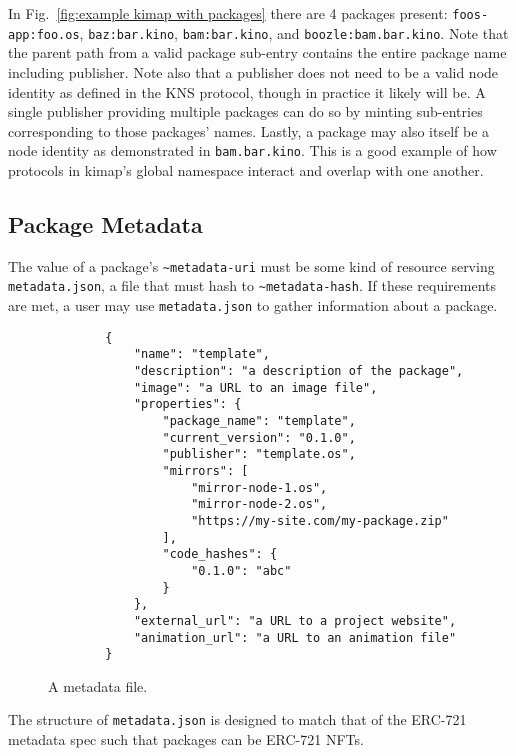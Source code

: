 \documentclass[runningheads]{llncs}
\begin{document}
In Fig.~\ref{fig:example kimap with packages} there are 4 packages present: \verb|foos-app:foo.os|, \verb|baz:bar.kino|, \verb|bam:bar.kino|, and \verb|boozle:bam.bar.kino|.
Note that the parent path from a valid package sub-entry contains the entire package name including publisher.
Note also that a publisher does not need to be a valid node identity as defined in the KNS protocol, though in practice it likely will be.
A single publisher providing multiple packages can do so by minting sub-entries corresponding to those packages' names.
Lastly, a package may also itself be a node identity as demonstrated in \verb|bam.bar.kino|.
This is a good example of how protocols in kimap's global namespace interact and overlap with one another.

\subsection{Package Metadata}
\label{sec:packagemanagermetadata}

The value of a package's \verb|~metadata-uri| must be some kind of resource serving \verb|metadata.json|, a file that must hash to \verb|~metadata-hash|.
If these requirements are met, a user may use \verb|metadata.json| to gather information about a package.

\begin{figure}[H]
    \centering
    \begin{verbatim}
        {
            "name": "template",
            "description": "a description of the package",
            "image": "a URL to an image file",
            "properties": {
                "package_name": "template",
                "current_version": "0.1.0",
                "publisher": "template.os",
                "mirrors": [
                    "mirror-node-1.os",
                    "mirror-node-2.os",
                    "https://my-site.com/my-package.zip"
                ],
                "code_hashes": {
                    "0.1.0": "abc"
                }
            },
            "external_url": "a URL to a project website",
            "animation_url": "a URL to an animation file"
        }
    \end{verbatim}
    \caption{A metadata file.}
    \label{fig:example metadata.json}
\end{figure}

The structure of \verb|metadata.json| is designed to match that of the ERC-721 metadata spec such that packages can be ERC-721 NFTs.
\end{document}
